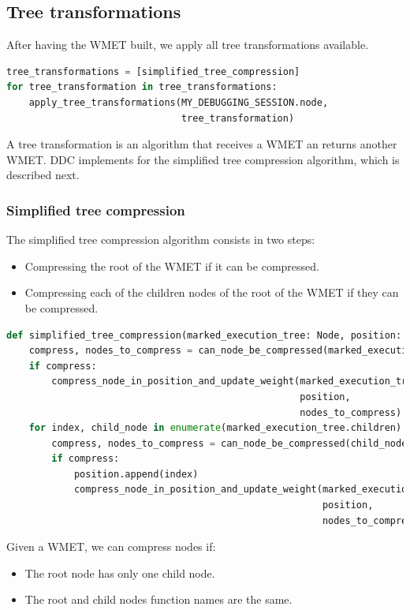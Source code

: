 \subsection{Tree transformations}
After having the WMET built, we apply all tree transformations available.
\begin{lstlisting}[language=Python, caption=Applying all tree transformations]
tree_transformations = [simplified_tree_compression]
for tree_transformation in tree_transformations:
    apply_tree_transformations(MY_DEBUGGING_SESSION.node,
                               tree_transformation)
\end{lstlisting}
A tree transformation is an algorithm that receives a WMET an returns another WMET.
DDC implements for the simplified tree compression algorithm, which is described next.
\subsubsection{Simplified tree compression}
The simplified tree compression algorithm consists in two steps:
\begin{itemize}
    \item Compressing the root of the WMET if it can be compressed.
    \item Compressing each of the children nodes of the root of the WMET if they can be compressed.
\end{itemize}
\begin{lstlisting}[language=Python, caption=Simplified tree compression algorithm]
def simplified_tree_compression(marked_execution_tree: Node, position: List[int]) -> None:
    compress, nodes_to_compress = can_node_be_compressed(marked_execution_tree)
    if compress:
        compress_node_in_position_and_update_weight(marked_execution_tree,
                                                    position,
                                                    nodes_to_compress)
    for index, child_node in enumerate(marked_execution_tree.children):
        compress, nodes_to_compress = can_node_be_compressed(child_node)
        if compress:
            position.append(index)
            compress_node_in_position_and_update_weight(marked_execution_tree,
                                                        position,
                                                        nodes_to_compress)
\end{lstlisting}
Given a WMET, we can compress nodes if:
\begin{itemize}
    \item The root node has only one child node.
    \item The root and child nodes function names are the same.
\end{itemize}

